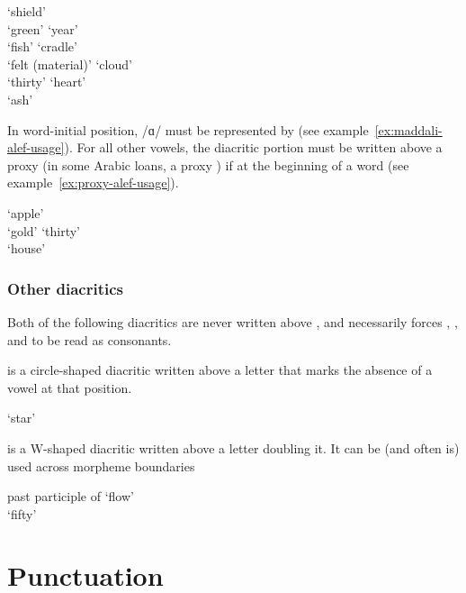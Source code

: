 \begin{lingexample}
	\ex \label{ex:zebar-alef}   `shield' \\
		  `green'
	\ex \label{ex:zebar-ye}   `year' \\
		  `fish'
	\ex \label{ex:zir-ye}   `cradle' \\
		  `felt (material)'
	\ex \label{ex:pish-waw}   `cloud' \\
		  `thirty'
	\ex \label{ex:tobe-waw}   `heart' \\
		  `ash'
\end{lingexample}

In word-initial position, /ɑ/ must be represented by  (see example~\ref{ex:maddali-alef-usage}).
For all other vowels, the diacritic portion must be written above a proxy  (in some Arabic loans, a proxy ) if at the beginning of a word (see example~\ref{ex:proxy-alef-usage}).

\begin{lingexample}
	\ex \label{ex:maddali-alef-usage}   `apple' \\
		  `gold'
	\ex \label{ex:proxy-alef-usage}   `thirty' \\
		  `house'
\end{lingexample}

\subsection{Other diacritics}

Both of the following diacritics are never written above , and necessarily forces , , and  to be read as consonants.

  is a circle-shaped diacritic written above a letter that marks the absence of a vowel at that position.

\begin{lingexample}
	\ex {}  `star'
\end{lingexample}

  is a W-shaped diacritic written above a letter doubling it.
It can be (and often is) used across morpheme boundaries

\begin{lingexample}
	\ex {}  past participle of  `flow' \\
		  `fifty'
\end{lingexample}

\chapter{Punctuation}
